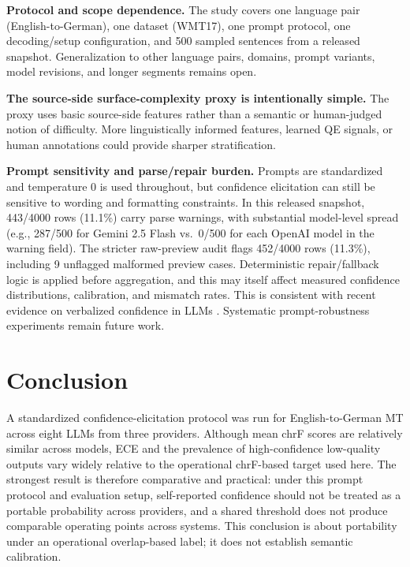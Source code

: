 \documentclass[10pt,conference]{IEEEtran}
\begin{document}
\textbf{Protocol and scope dependence.} The study covers one language pair (English-to-German), one dataset (WMT17), one prompt protocol, one decoding/setup configuration, and 500 sampled sentences from a released snapshot. Generalization to other language pairs, domains, prompt variants, model revisions, and longer segments remains open.

\textbf{The source-side surface-complexity proxy is intentionally simple.} The proxy uses basic source-side features rather than a semantic or human-judged notion of difficulty. More linguistically informed features, learned QE signals, or human annotations could provide sharper stratification.

\textbf{Prompt sensitivity and parse/repair burden.} Prompts are standardized and temperature 0 is used throughout, but confidence elicitation can still be sensitive to wording and formatting constraints. In this released snapshot, 443/4000 rows (11.1\%) carry parse warnings, with substantial model-level spread (e.g., 287/500 for Gemini 2.5 Flash vs.\ 0/500 for each OpenAI model in the warning field). The stricter raw-preview audit flags 452/4000 rows (11.3\%), including 9 unflagged malformed preview cases. Deterministic repair/fallback logic is applied before aggregation, and this may itself affect measured confidence distributions, calibration, and mismatch rates. This is consistent with recent evidence on verbalized confidence in LLMs \citep{yona-etal-2024-large}. Systematic prompt-robustness experiments remain future work.

\section{Conclusion}

A standardized confidence-elicitation protocol was run for English-to-German MT across eight LLMs from three providers. Although mean chrF scores are relatively similar across models, ECE and the prevalence of high-confidence low-quality outputs vary widely relative to the operational chrF-based target used here. The strongest result is therefore comparative and practical: under this prompt protocol and evaluation setup, self-reported confidence should not be treated as a portable probability across providers, and a shared threshold does not produce comparable operating points across systems. This conclusion is about portability under an operational overlap-based label; it does not establish semantic calibration.
\end{document}
